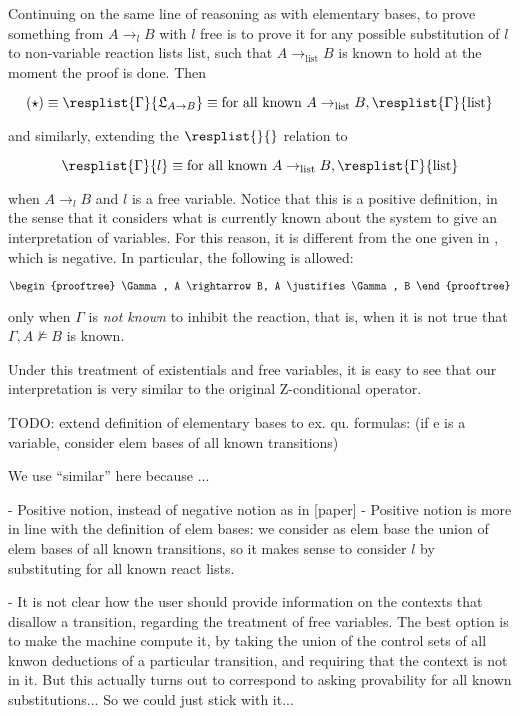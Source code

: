 Continuing on the same line of reasoning as with elementary bases, to prove
something from $A \rightarrow_l B$ with $l$ free is to prove it for any
possible substitution of $l$ to non-variable
reaction lists $\mathrm{list}$, such that
$A \rightarrow_{\mathrm{list}} B$ is known to hold at the moment the
proof is done.
Then

\[
  (\star) \equiv
  \resplist{\Gamma}{\mathfrak{L}_{A \rightarrow B}} \equiv
  \text{for all known } A \rightarrow_{\mathrm{list}} B,
  \resplist{\Gamma}{\mathrm{list}}
\]

and similarly, extending the $\resplist{}{}$ relation to

\[
  \resplist{\Gamma}{l} \equiv
  \text{for all known } A \rightarrow_{\mathrm{list}} B,
  \resplist{\Gamma}{\mathrm{list}}
\]

when $A \rightarrow_l B$ and $l$ is a free variable. Notice that this is a
positive definition, in the sense that it considers what is currently known
about the system to give an interpretation of variables.
For this reason, it is different from the one given in \cite{adding-logic},
which is negative. In particular, the following is allowed:

\[
  \begin{prooftree}
    \Gamma, A \rightarrow B, A
    \justifies
    \Gamma, B
  \end{prooftree}
\]

only when $\Gamma$ is \emph{not known} to inhibit the reaction, that is,
when it is not true that $\Gamma, A \not \models B$ is known.




Under this treatment of existentials and free variables, it is
easy to see that our interpretation is very similar to the original Z-conditional
operator.

TODO: extend definition of elementary bases to ex. qu. formulas: (if e is a
variable, consider elem bases of all known transitions)

We use ``similar'' here because ...

- Positive notion, instead of negative notion as in [paper]
- Positive notion is more in line with the definition of elem bases: we consider
  as elem base the union of elem bases of all known transitions, so it makes
  sense to consider $l$ by substituting for all known react lists.

- It is not clear how the user should provide information on the contexts that
disallow a transition, regarding the treatment of free variables. The best
option is to make the machine compute it, by taking the union of the control
sets of all knwon deductions of a particular transition, and requiring that the
context is not in it. But this actually turns out to correspond to asking
provability for all known substitutions... So we could just stick with it...



